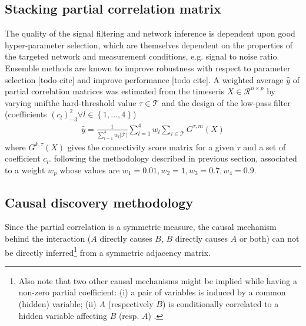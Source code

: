 \documentclass[wcp]{jmlr}
\begin{document}
\subsection{Stacking partial correlation matrix}
\label{sec:stacking}

The quality of the signal filtering and network inference is dependent upon
good hyper-parameter selection, which are themselves dependent on the properties
of the targeted network and measurement conditions, e.g. signal to noise ratio.
Ensemble methods are known to improve robustness with respect to parameter
selection [todo cite] and improve performance [todo cite].
A weighted average $\hat{y}$ of partial correlation matrices was estimated
from the timeseris $X \in \mathcal{R}^{n \times p}$
by varying unifthe hard-threshold value $\tau \in \mathcal{T}$  and the design
of the low-pass filter (coefficients
$(c_l)_{-3}^2 \forall l \in \left\{1,\ldots,4\right\}$)
\begin{align}
\hat{y} = \frac{1}{\sum_{l=1}^4 w_l |\mathcal{T}|} \sum_{l=1}^4  w_l \sum_{\tau \in \mathcal{T}} G^{\tau,m}(X)
\end{align}
where $G^{k, \tau}(X)$ gives the connectivity score matrix for
a given  $\tau$ and a set of coefficient $c_l$. following
the methodology described in previous section, associated to a weight
$w_p$ whose values are $w_1 = 0.01 , w_2 =1, w_3 = 0.7, w_4 = 0.9$.



\subsection{Causal discovery methodology}
Since the partial correlation is a symmetric measure, the causal mechanism behind the
interaction ($A$ directly causes $B$, $B$ directly causes $A$ or both) can not
be directly inferred\footnote{Also note that two other causal mechanisms might be
implied while having a non-zero partial coefficient: (i) a pair of variables
is induced by a common (hidden) variable; (ii) $A$ (respectively $B$) is
conditionally correlated to a hidden variable affecting $B$ (resp. $A$)
\cite{de2004discovery}.} from a symmetric adjacency matrix.
\end{document}
